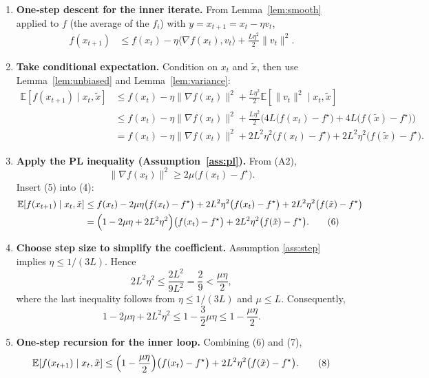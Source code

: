 \documentclass{article}
\newcommand{\E}{\mathbb{E}}
\begin{document}
\begin{enumerate}[label=[Step \arabic*], leftmargin=*]
\item \textbf{One‑step descent for the inner iterate.}  
From Lemma~\ref{lem:smooth} applied to $f$ (the average of the $f_i$) with $y=x_{t+1}=x_t-\eta v_t$,
\[
\begin{aligned}
f(x_{t+1})
&\le f(x_t)-\eta\langle\nabla f(x_t),v_t\rangle+\frac{L\eta^{2}}{2}\|v_t\|^{2}. \tag{3}
\end{aligned}
\]

\item \textbf{Take conditional expectation.}  
Condition on $x_t$ and $\tilde{x}$, then use Lemma~\ref{lem:unbiased} and Lemma~\ref{lem:variance}:
\[
\begin{aligned}
\E[ f(x_{t+1})\mid x_t,\tilde{x}]
&\le f(x_t)-\eta\|\nabla f(x_t)\|^{2}
   +\frac{L\eta^{2}}{2}\E[\|v_t\|^{2}\mid x_t,\tilde{x}]\\
&\le f(x_t)-\eta\|\nabla f(x_t)\|^{2}
   +\frac{L\eta^{2}}{2}\bigl(4L\bigl(f(x_t)-f^{\star}\bigr)
          +4L\bigl(f(\tilde{x})-f^{\star}\bigr)\bigr)\\
&= f(x_t)-\eta\|\nabla f(x_t)\|^{2}
   +2L^{2}\eta^{2}\bigl(f(x_t)-f^{\star}\bigr)
   +2L^{2}\eta^{2}\bigl(f(\tilde{x})-f^{\star}\bigr). \tag{4}
\end{aligned}
\]

\item \textbf{Apply the PL inequality (Assumption~\ref{ass:pl}).}  
From (A2),
\[
\|\nabla f(x_t)\|^{2}\ge 2\mu\bigl(f(x_t)-f^{\star}\bigr).
\tag{5}
\]
Insert (5) into (4):
\[
\begin{aligned}
\E[ f(x_{t+1})\mid x_t,\tilde{x}]
&\le f(x_t)-2\mu\eta\bigl(f(x_t)-f^{\star}\bigr)
   +2L^{2}\eta^{2}\bigl(f(x_t)-f^{\star}\bigr)
   +2L^{2}\eta^{2}\bigl(f(\tilde{x})-f^{\star}\bigr)\\
&= \Bigl(1-2\mu\eta+2L^{2}\eta^{2}\Bigr)\bigl(f(x_t)-f^{\star}\bigr)
   +2L^{2}\eta^{2}\bigl(f(\tilde{x})-f^{\star}\bigr). \tag{6}
\end{aligned}
\]

\item \textbf{Choose step size to simplify the coefficient.}  
Assumption \ref{ass:step} implies $\eta\le 1/(3L)$. Hence
\[
2L^{2}\eta^{2}\le \frac{2L^{2}}{9L^{2}}=\frac{2}{9}<\frac{\mu\eta}{2},
\]
where the last inequality follows from $\eta\le 1/(3L)$ and $\mu\le L$. Consequently,
\[
1-2\mu\eta+2L^{2}\eta^{2}\le 1-\frac{3}{2}\mu\eta\le 1-\frac{\mu\eta}{2}. \tag{7}
\]

\item \textbf{One‑step recursion for the inner loop.}  
Combining (6) and (7),
\[
\E[ f(x_{t+1})\mid x_t,\tilde{x}]
\le \Bigl(1-\frac{\mu\eta}{2}\Bigr)\bigl(f(x_t)-f^{\star}\bigr)
   +2L^{2}\eta^{2}\bigl(f(\tilde{x})-f^{\star}\bigr). \tag{8}
\]


\end{enumerate}
\end{document}
